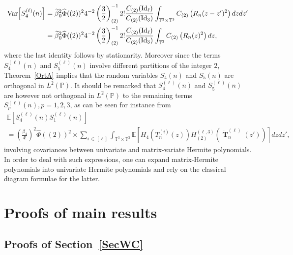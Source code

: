 \documentclass[10pt]{amsart}
\theoremstyle{definition}\newtheorem{defi}[theo]{Definition}\newtheorem{rema}[theo]{Remark}\newtheorem{exam}[theo]{Example}\newtheorem{exem}[theo]{Example}\newtheorem{nota}[theo]{Notation}
\DeclareMathOperator{\Id}{Id}
\DeclareMathOperator{\bT}{\mathbf{T}}
\newcommand{\T}{\mathbb{T}^3}
\newcommand{\Prob}{\mathbb{P}}
\newcommand{\E}[1]{\mathbb{E}\left[#1\right]}
\newcommand{\V}[1]{\mathrm{Var}{\left[#1\right]}}
\let\oldtilde\tilde
\renewcommand*{\tilde}[1]{\mathchoice{\widetilde{#1}}{\widetilde{#1}}{\oldtilde{#1}}{\oldtilde{#1}}}
\begin{document}
\begin{align*}
\V{S_4^{(\ell)}(n)} &= \tilde{\beta}_0^2\widehat{\Phi}((2))^2 4^{-2}\left(\frac{3}{2}\right)_{(2)}^{-1} 2 ! \frac{C_{(2)}(\Id_{\ell})}{C_{(2)}(\Id_3)}
\int_{\T\times \T}C_{(2)}\left(R_n(z-z')^2\right)dzdz'\\
&=\tilde{\beta}_0^2\widehat{\Phi}((2))^2 4^{-2}\left(\frac{3}{2}\right)_{(2)}^{-1} 2 ! \frac{C_{(2)}(\Id_{\ell})}{C_{(2)}(\Id_3)}
\int_{\T }C_{(2)}\left(R_n(z)^2\right)dz,
\end{align*}
where the last identity follows by stationarity. Moreover since the terms $S_4^{(\ell)}(n)$ and $S_5^{(\ell)}(n)$ involve different partitions of the integer $2$, Theorem~\ref{OrtA} implies that the random variables $S_4(n)$ and $S_5(n)$ are orthogonal in $L^2(\Prob)$. It should be remarked that $S_4^{(\ell)}(n)$ and $S_5^{(\ell)}(n)$ are however not orthogonal in $L^2(\Prob)$ to the remaining terms $S_p^{(\ell)}(n), p=1,2,3$, as can be seen for instance from
\begin{multline*}
\E{S_4^{(\ell)}(n) S_1^{(\ell)}(n)}\\
=
\left(\frac{\beta_4}{4!}\right)^2 \widehat{\Phi}((2))^2 \times\sum_{i\,\in\,[\ell]} \int_{\T\times \T} \E{ H_4\left(T_n^{(i)}(z)\right) H_{(2)}^{(\ell,3)}\left(\dot{\bT}_n^{(\ell)}(z')\right) } dzdz',
\end{multline*}
involving covariances between univariate and matrix-variate Hermite polynomials. In order to deal with such expressions, one can expand matrix-Hermite polynomials into univariate Hermite polynomials and rely on the classical diagram formulae for the latter.



\section{Proofs of main results}\label{SecProofs}
\subsection{Proofs of Section~\ref{SecWC}}
\end{document}
